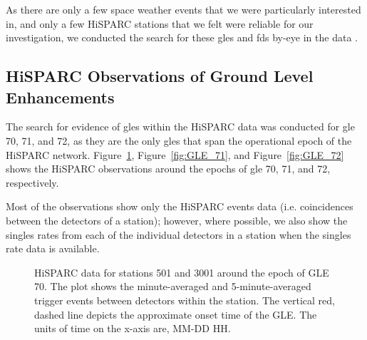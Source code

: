 As there are only a few space weather events that we were particularly interested in, and only a few HiSPARC stations that we felt were reliable for our investigation, we conducted the search for these \glspl{gle} and \glspl{fd} by-eye in the data
.

\subsection{HiSPARC Observations of Ground Level Enhancements}

The search for evidence of \glspl{gle} within the HiSPARC data was conducted for \gls{gle} 70, 71, and 72, as they are the only \glspl{gle} that span the operational epoch of the HiSPARC network. Figure~\ref{fig:GLE_70}, Figure~\ref{fig:GLE_71}, and Figure~\ref{fig:GLE_72} shows the HiSPARC observations around the epochs of \gls{gle} 70, 71, and 72, respectively.

Most of the observations show only the HiSPARC events data (i.e. coincidences between the detectors of a station); however, where possible, we also show the singles rates from each of the individual detectors in a station when the singles rate data is available.

\begin{figure}[ht!]
	\centering
	
	\caption{HiSPARC data for stations 501 and 3001 around the epoch of GLE 70. The plot shows the minute-averaged and 5-minute-averaged trigger events between detectors within the station. The vertical red, dashed line depicts the approximate onset time of the GLE. The units of time on the x-axis are, MM-DD HH.}
	\label{fig:GLE_70}
\end{figure}

